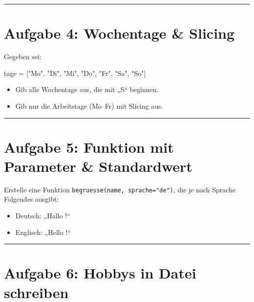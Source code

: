 \documentclass[
  letterpaper,
  DIV=11,
  numbers=noendperiod]{scrreprt}
\newenvironment{Shaded}{\begin{snugshade}}{\end{snugshade}}
\newcommand{\NormalTok}[1]{\textcolor[rgb]{0.00,0.23,0.31}{#1}}
\newcommand{\OperatorTok}[1]{\textcolor[rgb]{0.37,0.37,0.37}{#1}}
\newcommand{\StringTok}[1]{\textcolor[rgb]{0.13,0.47,0.30}{#1}}
\providecommand{\tightlist}{%
  \setlength{\itemsep}{0pt}\setlength{\parskip}{0pt}}\usepackage{longtable,booktabs,array}
\begin{document}
\begin{center}\rule{0.5\linewidth}{0.5pt}\end{center}

\section{Aufgabe 4: Wochentage \&
Slicing}\label{aufgabe-4-wochentage-slicing}

Gegeben sei:

\begin{Shaded}
\begin{Highlighting}[]
\NormalTok{tage }\OperatorTok{=}\NormalTok{ [}\StringTok{"Mo"}\NormalTok{, }\StringTok{"Di"}\NormalTok{, }\StringTok{"Mi"}\NormalTok{, }\StringTok{"Do"}\NormalTok{, }\StringTok{"Fr"}\NormalTok{, }\StringTok{"Sa"}\NormalTok{, }\StringTok{"So"}\NormalTok{]}
\end{Highlighting}
\end{Shaded}

\begin{itemize}
\tightlist
\item
  Gib alle Wochentage aus, die mit „S`` beginnen.
\item
  Gib nur die Arbeitstage (Mo--Fr) mit Slicing aus.
\end{itemize}

\begin{center}\rule{0.5\linewidth}{0.5pt}\end{center}

\section{Aufgabe 5: Funktion mit Parameter \&
Standardwert}\label{aufgabe-5-funktion-mit-parameter-standardwert}

Erstelle eine Funktion \texttt{begruesse(name,\ sprache="de")}, die je
nach Sprache Folgendes ausgibt:

\begin{itemize}
\tightlist
\item
  Deutsch: „Hallo !{}``
\item
  Englisch: „Hello !{}``
\end{itemize}

\begin{center}\rule{0.5\linewidth}{0.5pt}\end{center}

\section{Aufgabe 6: Hobbys in Datei
schreiben}\label{aufgabe-6-hobbys-in-datei-schreiben}
\end{document}
